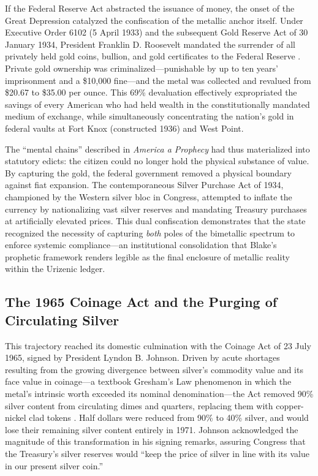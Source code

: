 \documentclass[
]{article}
\begin{document}
If the Federal Reserve Act abstracted the issuance of money, the onset
of the Great Depression catalyzed the confiscation of the metallic
anchor itself. Under Executive Order 6102 (5 April 1933) and the
subsequent Gold Reserve Act of 30 January 1934, President Franklin D.
Roosevelt mandated the surrender of all privately held gold coins,
bullion, and gold certificates to the Federal Reserve
\citep{roosevelt1933executive}. Private gold ownership was
criminalized---punishable by up to ten years' imprisonment and a
\$10,000 fine---and the metal was collected and revalued from \$20.67 to
\$35.00 per ounce. This 69\% devaluation effectively expropriated the
savings of every American who had held wealth in the constitutionally
mandated medium of exchange, while simultaneously concentrating the
nation's gold in federal vaults at Fort Knox (constructed 1936) and West
Point.

The ``mental chains'' described in \emph{America a Prophecy} had thus
materialized into statutory edicts: the citizen could no longer hold the
physical substance of value. By capturing the gold, the federal
government removed a physical boundary against fiat expansion. The
contemporaneous Silver Purchase Act of 1934, championed by the Western
silver bloc in Congress, attempted to inflate the currency by
nationalizing vast silver reserves and mandating Treasury purchases at
artificially elevated prices. This dual confiscation demonstrates that
the state recognized the necessity of capturing \emph{both} poles of the
bimetallic spectrum to enforce systemic compliance---an institutional
consolidation that Blake's prophetic framework renders legible as the
final enclosure of metallic reality within the Urizenic ledger.

\subsection{The 1965 Coinage Act and the Purging of Circulating
Silver}\label{the-1965-coinage-act-and-the-purging-of-circulating-silver}

This trajectory reached its domestic culmination with the Coinage Act of
23 July 1965, signed by President Lyndon B. Johnson. Driven by acute
shortages resulting from the growing divergence between silver's
commodity value and its face value in coinage---a textbook Gresham's Law
phenomenon in which the metal's intrinsic worth exceeded its nominal
denomination---the Act removed 90\% silver content from circulating
dimes and quarters, replacing them with copper-nickel clad tokens
\citep{johnson1965coinage}. Half dollars were reduced from 90\% to 40\%
silver, and would lose their remaining silver content entirely in 1971.
Johnson acknowledged the magnitude of this transformation in his signing
remarks, assuring Congress that the Treasury's silver reserves would
``keep the price of silver in line with its value in our present silver
coin.''
\end{document}
